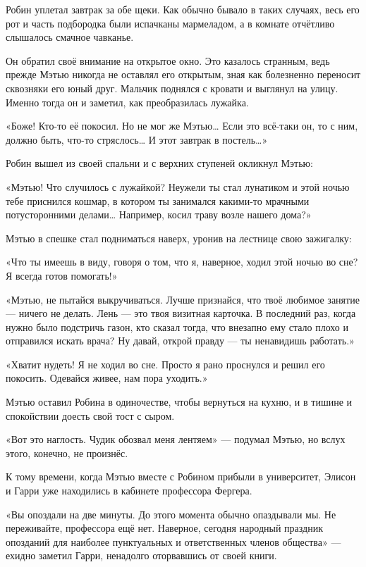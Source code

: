 \documentclass[a5paper, 9pt,
final, openany, twoside=true]{memoir}
\begin{document}
Робин уплетал завтрак за обе щеки. Как обычно бывало в таких случаях, весь его рот и часть подбородка были испачканы мармеладом, а в комнате отчётливо слышалось смачное чавканье.

Он обратил своё внимание на открытое окно. Это казалось странным, ведь прежде Мэтью никогда не оставлял его открытым, зная как болезненно переносит сквозняки его юный друг. Мальчик поднялся с кровати и выглянул на улицу. Именно тогда он и заметил, как преобразилась лужайка.

«Боже! Кто-то её покосил. Но не мог же Мэтью… Если это всё-таки он, то с ним, должно быть, что-то стряслось… И этот завтрак в постель…»

Робин вышел из своей спальни и с верхних ступеней окликнул Мэтью:

«Мэтью! Что случилось с лужайкой? Неужели ты стал лунатиком и этой ночью тебе приснился кошмар, в котором ты занимался какими-то мрачными потусторонними делами… Например, косил траву возле нашего дома?»

Мэтью в спешке стал подниматься наверх, уронив на лестнице свою зажигалку:

«Что ты имеешь в виду, говоря о том, что я, наверное, ходил этой ночью во сне? Я всегда готов помогать!»

«Мэтью, не пытайся выкручиваться. Лучше признайся, что твоё любимое занятие — ничего не делать. Лень — это твоя визитная карточка. В последний раз, когда нужно было подстричь газон, кто сказал тогда, что внезапно ему стало плохо и отправился искать врача? Ну давай, открой правду — ты ненавидишь работать.»

«Хватит нудеть! Я не ходил во сне. Просто я рано проснулся и решил его покосить. Одевайся живее, нам пора уходить.»

Мэтью оставил Робина в одиночестве, чтобы вернуться на кухню, и в тишине и спокойствии доесть свой тост с сыром.

«Вот это наглость. Чудик обозвал меня лентяем» — подумал Мэтью, но вслух этого, конечно, не произнёс.\bigskip

К тому времени, когда Мэтью вместе с Робином прибыли в университет, Элисон и Гарри уже находились в кабинете профессора Фергера.

«Вы опоздали на две минуты. До этого момента обычно опаздывали мы. Не переживайте, профессора ещё нет. Наверное, сегодня народный праздник опозданий для наиболее пунктуальных и ответственных членов общества» — ехидно заметил Гарри, ненадолго оторвавшись от своей книги.
\end{document}
